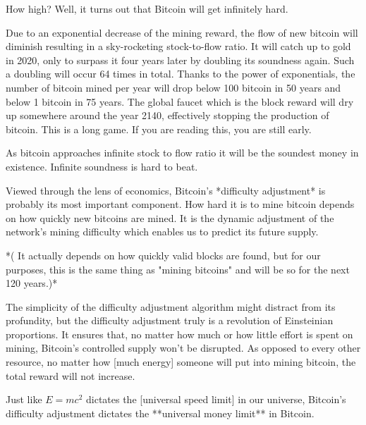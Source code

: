 How high? Well, it turns out that Bitcoin will get infinitely hard.




Due to an exponential decrease of the mining reward, the flow of new
bitcoin will diminish resulting in a sky-rocketing stock-to-flow ratio.
It will catch up to gold in 2020, only to surpass it four years later by
doubling its soundness again. Such a doubling will occur 64 times in
total. Thanks to the power of exponentials, the number of bitcoin mined
per year will drop below 100 bitcoin in 50 years and below 1 bitcoin in
75 years. The global faucet which is the block reward will dry up
somewhere around the year 2140, effectively stopping the production of
bitcoin. This is a long game. If you are reading this, you are still
early.


As bitcoin approaches infinite stock to flow ratio it will be the
soundest money in existence. Infinite soundness is hard to beat.

Viewed through the lens of economics, Bitcoin's *difficulty adjustment*
is probably its most important component. How hard it is to mine bitcoin
depends on how quickly new bitcoins are mined\*. It is the dynamic
adjustment of the network's mining difficulty which enables us to
predict its future supply.

*(\* It actually depends on how quickly valid blocks are found, but for
our purposes, this is the same thing as "mining bitcoins" and will be so
for the next 120 years.)*

The simplicity of the difficulty adjustment algorithm might distract
from its profundity, but the difficulty adjustment truly is a revolution
of Einsteinian proportions. It ensures that, no matter how much or how
little effort is spent on mining, Bitcoin's controlled supply won't be
disrupted. As opposed to every other resource, no matter how [much
energy] someone will put into mining bitcoin, the total reward will not
increase.

Just like $E=mc^2$ dictates the [universal speed limit] in our universe,
Bitcoin's difficulty adjustment dictates the **universal money limit**
in Bitcoin.

